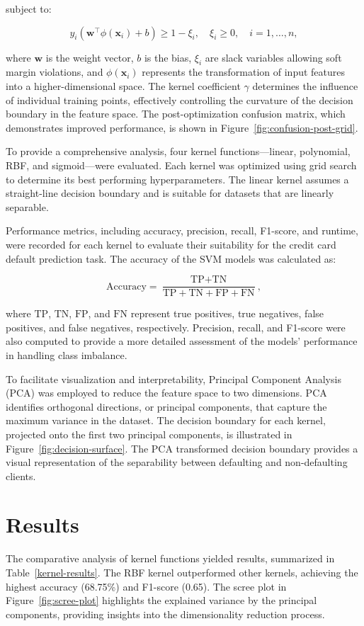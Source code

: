 \documentclass{article}
\begin{document}
subject to:

\[
y_i (\mathbf{w}^\top \phi(\mathbf{x}_i) + b) \geq 1 - \xi_i, \quad \xi_i \geq 0, \quad i = 1, \dots, n,
\]

where \(\mathbf{w}\) is the weight vector, \(b\) is the bias, \(\xi_i\) are slack variables allowing soft margin violations, and \(\phi(\mathbf{x}_i)\) represents the transformation of input features into a higher-dimensional space. 
The kernel coefficient \(\gamma\) determines the influence of individual training points, effectively controlling the curvature of the decision boundary in the feature space. The post-optimization confusion matrix, 
which demonstrates improved performance, is shown in Figure~\ref{fig:confusion-post-grid}.

To provide a comprehensive analysis, four kernel functions—linear, polynomial, RBF, and sigmoid—were evaluated. Each kernel was optimized using grid search to determine its best performing hyperparameters. 
The linear kernel assumes a straight-line decision boundary and is suitable for datasets that are linearly separable. 

Performance metrics, including accuracy, precision, recall, F1-score, and runtime, were recorded for each kernel to evaluate their suitability for the credit card default prediction task. The accuracy of the SVM models was calculated as:

\[
\text{Accuracy} = \frac{\text{TP} + \text{TN}}{\text{TP} + \text{TN} + \text{FP} + \text{FN}},
\]

where \(\text{TP}\), \(\text{TN}\), \(\text{FP}\), and \(\text{FN}\) represent true positives, true negatives, false positives, and false negatives, respectively. Precision, recall, 
and F1-score were also computed to provide a more detailed assessment of the models' performance in handling class imbalance.

To facilitate visualization and interpretability, Principal Component Analysis (PCA) was employed to reduce the feature space to two dimensions. PCA identifies orthogonal directions, or principal components, 
that capture the maximum variance in the dataset. The decision boundary for each kernel, projected onto the first two principal components, is illustrated in Figure~\ref{fig:decision-surface}. 
The PCA transformed decision boundary provides a visual representation of the separability between defaulting and non-defaulting clients.


\section{Results}
The comparative analysis of kernel functions yielded results, summarized in Table~\ref{kernel-results}. The RBF kernel outperformed other kernels, achieving the highest accuracy (68.75\%) and F1-score (0.65). 
The scree plot in Figure~\ref{fig:scree-plot} highlights the explained variance by the principal components, providing insights into the dimensionality reduction process.
\end{document}
